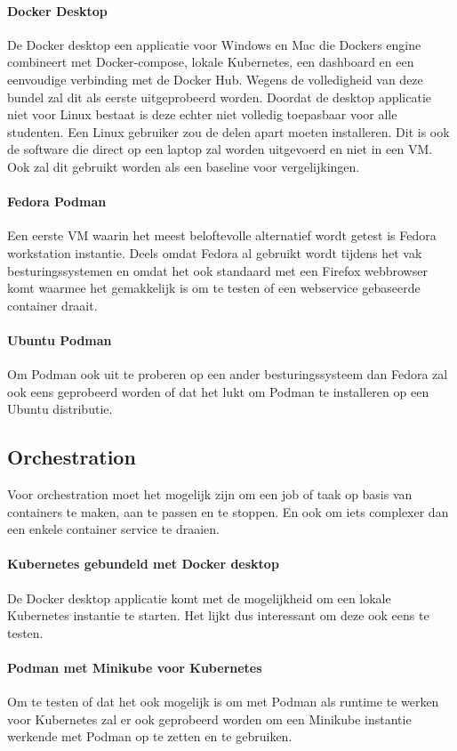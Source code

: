 \paragraph{Docker Desktop}
De Docker desktop een applicatie voor Windows en Mac die Dockers engine combineert met Docker-compose, lokale Kubernetes, een dashboard en een eenvoudige verbinding met de Docker Hub. Wegens de volledigheid van deze bundel zal dit als eerste uitgeprobeerd worden. Doordat de desktop applicatie niet voor Linux bestaat is deze echter niet volledig toepasbaar voor alle studenten. Een Linux gebruiker zou de delen apart moeten installeren. Dit is ook de software die direct op een laptop zal worden uitgevoerd en niet in een VM. Ook zal dit gebruikt worden als een baseline voor vergelijkingen.  

\paragraph{Fedora Podman}
Een eerste VM waarin het meest beloftevolle alternatief wordt getest is Fedora workstation instantie. Deels omdat Fedora al gebruikt wordt tijdens het vak besturingssystemen en omdat het ook standaard met een Firefox webbrowser komt waarmee het gemakkelijk is om te testen of een webservice gebaseerde container draait.

\paragraph{Ubuntu Podman}
Om Podman ook uit te proberen op een ander besturingssysteem dan Fedora zal ook eens geprobeerd worden of dat het lukt om Podman te installeren op een Ubuntu distributie.

\subsection{Orchestration}
Voor orchestration moet het mogelijk zijn om een job of taak op basis van containers te maken, aan te passen en te stoppen. En ook om iets complexer dan een enkele container service te draaien.

\paragraph{Kubernetes gebundeld met Docker desktop}
De Docker desktop applicatie komt met de mogelijkheid om een lokale Kubernetes instantie te starten. Het lijkt dus interessant om deze ook eens te testen.

\paragraph{Podman met Minikube voor Kubernetes}
Om te testen of dat het ook mogelijk is om met Podman als runtime te werken voor Kubernetes zal er ook geprobeerd worden om een Minikube instantie werkende met Podman op te zetten en te gebruiken.

